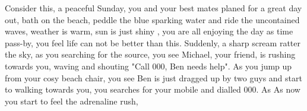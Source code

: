 Consider this, a peaceful Sunday, you and your best mates planed for a great day out, bath on the beach, peddle the blue sparking water and ride the uncontained waves, weather is warm, sun is just shiny , you are all enjoying the day as time pass-by, you feel life can not be better than this. Suddenly, a sharp scream ratter the sky, as you searching for the source, you see Michael, your friend, is rushing towards you, waving and shouting "Call 000, Ben needs help". As you jump up from your cosy beach chair, you see Ben is just dragged up by two guys and start to walking towards you, you searches for your mobile and dialled 000. As As now you start to feel the adrenaline rush,  